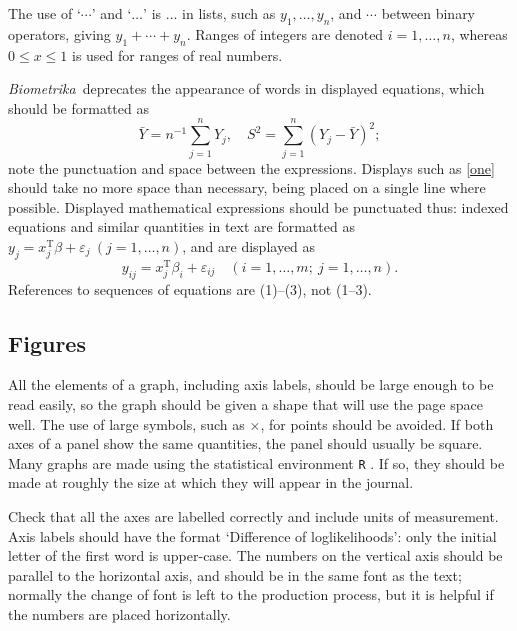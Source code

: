 \documentclass[lineno]{biometrika}
\def\Bka{{\it Biometrika}}
\def\T{{ \mathrm{\scriptscriptstyle T} }}
\def\v{{\varepsilon}}
\begin{document}
The use of `$\cdots$' and `$\ldots$' is  $\ldots$ in lists, such as $y_1,\ldots,y_n$, and $\cdots$ between binary operators,  giving $y_1+\cdots+y_n$.
Ranges of integers are denoted $i=1,\ldots, n$, whereas $0\leq x\leq 1$ is used for ranges of real numbers.  %

\Bka\ deprecates the appearance of words in displayed equations, which should be formatted as
\begin{equation}
\label{one}
\bar Y = n^{-1} \sum_{j=1}^n Y_j,\quad S^2 = \sum_{j=1}^n (Y_j-\bar Y)^2;
\end{equation}
note the punctuation and space between the expressions. Displays such as \eqref{one} should take no more space than necessary, being placed on a single line where possible.  Displayed mathematical expressions should be punctuated thus: indexed equations and similar quantities in text are formatted as
$y_j = x_j^\T\beta + \v_j\ (j=1,\ldots, n)$, and are displayed as
\[
y_{ij} = x_j^\T\beta_i + \v_{ij}\quad (i=1,\ldots, m;\ j=1,\ldots, n).
\]
References to sequences of equations are (1)--(3), not (1--3).

\subsection{Figures}


All the elements of a graph, including axis labels, should be large enough to be read easily, so the graph should be given a shape that will use the page space well. The use of large symbols, such as $\times$, for points should be avoided. If both axes of a panel show the same quantities, the panel should usually be square.  Many graphs are made using the statistical environment \texttt{R} \citep{R:2010}.  If so, they should be made at roughly the size at which they will appear in the journal.

Check that all the axes are labelled correctly and include units of measurement.  Axis labels should have the format `Difference of loglikelihoods': only the initial letter of the first word is upper-case.
The numbers on the vertical axis should be parallel to the horizontal axis, and should be in the same font as the text; normally the change of font is left to the production process, but it is helpful if the numbers are placed horizontally.
\end{document}
